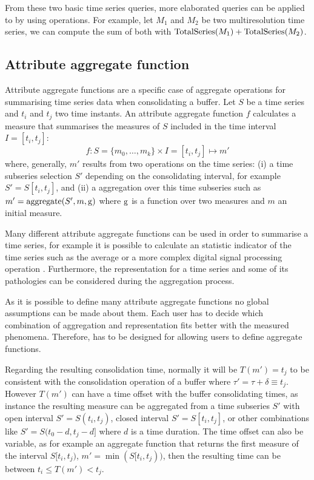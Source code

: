 From these two basic time series queries, more elaborated queries can
be applied to  by using  operations. For
example, let $M_1$ and $M_2$ be two multiresolution time series, we
can compute the sum of both with $\operatorname{TotalSeries}(M_1) +
\operatorname{TotalSeries}(M_2)$.





\subsection{Attribute aggregate function}
\label{sec:model:interpolador}

Attribute aggregate functions are a specific case of 
aggregate operations for summarising time series data when
consolidating a buffer. Let $S$ be a time series and $t_i$ and $t_j$
two time instants. An attribute aggregate function $f$ calculates a
measure that summarises the measures of $S$ included in the time
interval $I=[t_i,t_j]$:
\[
f : S=\{m_0,\ldots,m_k\} \times I=[t_i,t_j] \mapsto m'
\]
where, generally, $m'$ results from two operations on the time series:
(i) a time subseries selection $S'$ depending on the consolidating
interval, for example $S' = S[t_i,t_j]$, and (ii) a 
aggregation over this time subseries such as $m' = \operatorname*{aggregate}(S',m, \operatorname*{g})$
where $\operatorname*{g}$ is a function over two measures and $m$ an initial
measure.


Many different attribute aggregate functions can be used in order to
summarise a time series, for example it is possible to calculate an
statistic indicator of the time series such as the average or a more
complex digital signal processing operation
\cite{zhang11}. Furthermore, the representation for a time series and
some of its pathologies can be considered during the aggregation
process.


As it is possible to define many attribute aggregate
functions no global assumptions can be made about them. Each user has
to decide which combination of aggregation and representation fits
better with the measured phenomena.  Therefore,  has to be
designed for allowing users to define aggregate functions.





Regarding the resulting consolidation time, normally it will be
$T(m')=t_j$ to be consistent with the consolidation operation of a
buffer where $\tau' = \tau + \delta \equiv t_j$. However $T(m')$ can
have a time offset with the buffer consolidating times, as instance
the resulting measure can be aggregated from a time subseries $S'$
with open interval $S'=S(t_i,t_j)$, closed interval $S'=S[t_i,t_j]$,
or other combinations like $S'=S(t_0-d,t_j-d]$ where $d$ is a time
duration.  The time offset can also be variable, as for example an
aggregate function that returns the first measure of the interval
$S[t_i,t_j)$, $m'=\min(S[t_i,t_j))$, then the resulting time can be
between $t_i \leq T(m') < t_j$.



